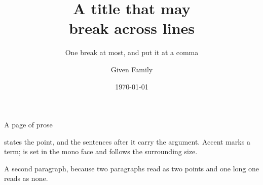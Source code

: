 \documentclass[aspectratio=169]{beamer}
\title[Short title for the footer]{%
  A title that may\\break across lines}
\subtitle{One break at most, and put it at a comma}
\author[Family Name]{Given Family}
\institute{Your institution}
\date{\MakeUppercase{\today}}
\begin{document}
\begin{frame}[plain]
  \titlepage
\end{frame}

%

\begin{frame}{A page of prose}

   states the point, and the sentences after it carry
  the argument. \ac{Accent} marks a term;  is set in the mono
  face and follows the surrounding size.

  A second paragraph, because two paragraphs read as two points and one long
  one reads as none.


\end{frame}
\end{document}
